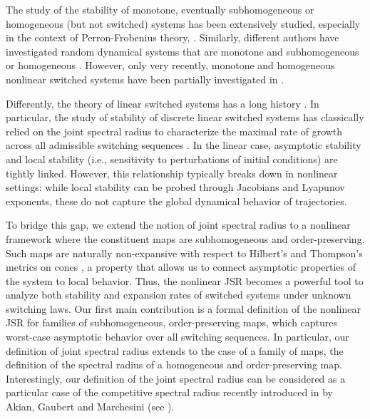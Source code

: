 \documentclass{article}
\begin{document}
The study of the stability of monotone, eventually subhomogeneous or homogeneous (but not switched) systems has been extensively studied, especially in the context of Perron-Frobenius theory, \cite{lemmens2012nonlinear,akian2011stability, hirsch2006monotone, karlsson2001non, karlsson2024metric, lemmens2018denjoy}.
Similarly, different authors have investigated random dynamical systems that are monotone and subhomogeneous or homogeneous \cite{nussbaum1990some, reich1999convergence, gouezel2020subadditive, karlsson2021linear}. However, only very recently, monotone and homogeneous nonlinear switched systems have been partially investigated in \cite{akian2024competive}.
%

Differently, the theory of linear switched systems has a long history \cite{sun2006switched}. In particular, the study of stability of discrete linear switched systems has classically relied on the joint spectral radius to characterize the maximal rate of growth across all admissible switching sequences \cite{jungers2009joint, brayton1980constructive, brayton1979stability}. In the linear case, asymptotic stability and local stability (i.e., sensitivity to perturbations of initial conditions) are tightly linked. However, this relationship typically breaks down in nonlinear settings: while local stability can be probed through Jacobians and Lyapunov exponents, these do not capture the global dynamical behavior of trajectories.
%

To bridge this gap, we extend the notion of joint spectral radius to a nonlinear framework where the constituent maps are subhomogeneous and order-preserving. Such maps are naturally non-expansive with respect to Hilbert's and Thompson's metrics on cones \cite{lemmens2012nonlinear}, a property that allows us to connect asymptotic properties of the system to local behavior. Thus, the nonlinear JSR becomes a powerful tool to analyze both stability and expansion rates of switched systems under unknown switching laws.
%
%
Our first main contribution is a formal definition of the nonlinear JSR for families of subhomogeneous, order-preserving maps, which captures worst-case asymptotic behavior over all switching sequences. In particular, our definition of joint spectral radius extends to the case of a family of maps, the definition of the spectral radius of a homogeneous and order-preserving map.  
%
Interestingly, our definition of the joint spectral radius can be considered as a particular case of the competitive spectral radius recently introduced in \cite{akian2024competive} by Akian, Gaubert and Marchesini (see ).
\end{document}

